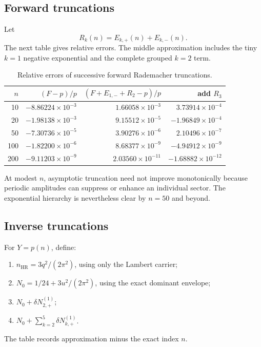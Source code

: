 \documentclass[11pt]{article}
\numberwithin{equation}{section}
\theoremstyle{mainthm}
\theoremstyle{defstyle}
\theoremstyle{remark}
\begin{document}
\subsection{Forward truncations}

Let
\[
 R_k(n)=E_{k,+}(n)+E_{k,-}(n).
\]
The next table gives relative errors.  The middle approximation includes the tiny \(k=1\) negative exponential and the complete grouped \(k=2\) term.

\begin{table}[htbp]
\centering
\caption{Relative errors of successive forward Rademacher truncations.}
\label{tab:forward-errors}
\begin{tabular}{r r r r}
\toprule
\(n\) & \((F-p)/p\) & \((F+E_{1,-}+R_2-p)/p\) & add \(R_3\) \\
\midrule
10  & \(-8.86224\times10^{-3}\) & \( 1.66058\times10^{-3}\) & \( 3.73914\times10^{-4}\) \\
20  & \(-1.98138\times10^{-3}\) & \( 9.15512\times10^{-5}\) & \(-1.96849\times10^{-4}\) \\
50  & \(-7.30736\times10^{-5}\) & \( 3.90276\times10^{-6}\) & \( 2.10496\times10^{-7}\) \\
100 & \(-1.82200\times10^{-6}\) & \( 8.68377\times10^{-9}\) & \(-4.94912\times10^{-9}\) \\
200 & \(-9.11203\times10^{-9}\) & \( 2.03560\times10^{-11}\) & \(-1.68882\times10^{-12}\) \\
\bottomrule
\end{tabular}
\end{table}

At modest \(n\), asymptotic truncation need not improve monotonically because periodic amplitudes can suppress or enhance an individual sector.  The exponential hierarchy is nevertheless clear by \(n=50\) and beyond.

\subsection{Inverse truncations}

For \(Y=p(n)\), define:
\begin{enumerate}
\item \(n_{\mathrm{HR}}=3q^2/(2\pi^2)\), using only the Lambert carrier;
\item \(N_0=1/24+3u^2/(2\pi^2)\), using the exact dominant envelope;
\item \(N_0+\delta N_{2,+}^{(1)}\);
\item \(N_0+\sum_{k=2}^{5}\delta N_{k,+}^{(1)}\).
\end{enumerate}
The table records approximation minus the exact index \(n\).
\end{document}
